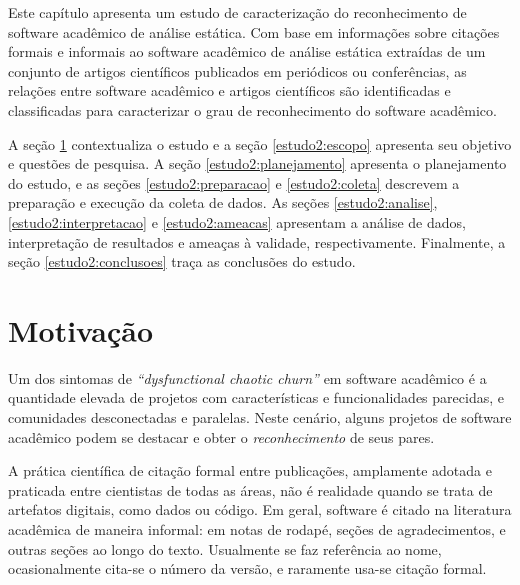 {}\label{estudo2}

Este capítulo apresenta
um estudo de caracterização do reconhecimento de software acadêmico de análise estática.
Com base em informações sobre
citações formais e informais ao software acadêmico de análise estática %
extraídas de um conjunto de artigos científicos publicados em periódicos ou conferências,
as relações entre software acadêmico e artigos científicos
são identificadas e classificadas %
para caracterizar o grau de reconhecimento do software acadêmico.

A seção \ref{estudo2:introducao} contextualiza o estudo
e a seção \ref{estudo2:escopo} apresenta seu objetivo e questões de pesquisa.
A seção \ref{estudo2:planejamento} apresenta o planejamento do estudo, e
as seções \ref{estudo2:preparacao} e \ref{estudo2:coleta} descrevem a preparação e execução da coleta de dados.
As seções \ref{estudo2:analise}, \ref{estudo2:interpretacao} e \ref{estudo2:ameacas}
apresentam a análise de dados, interpretação de resultados e ameaças à validade, respectivamente.
Finalmente, a seção \ref{estudo2:conclusoes} traça as conclusões do estudo.

\section{Motivação} \label{estudo2:introducao} %

Um dos sintomas de 
{\it ``dysfunctional chaotic churn''} \cite{howison2015understanding}
em software acadêmico é a quantidade elevada de projetos 
com características e funcionalidades parecidas, 
e comunidades desconectadas e paralelas.
Neste cenário, alguns projetos de software acadêmico
podem se destacar e obter o \textit{reconhecimento} de seus pares.

A prática científica de citação formal entre publicações, amplamente
adotada e praticada entre cientistas de todas as áreas, não é realidade quando
se trata de artefatos digitais, como dados ou código.
Em geral, software é citado na literatura acadêmica %
de maneira informal: em notas de rodapé, seções de agradecimentos, e outras
seções ao longo do texto. Usualmente se faz referência ao nome, ocasionalmente
cita-se o número da versão, e raramente usa-se citação formal.


